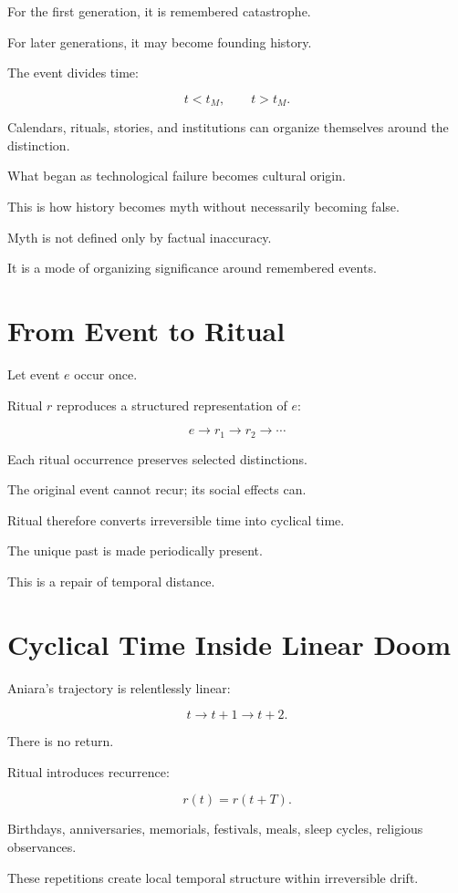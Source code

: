 \documentclass[11pt,oneside]{book}
\theoremstyle{definition}
\theoremstyle{remark}
\begin{document}
For the first generation, it is remembered catastrophe.

For later generations, it may become founding history.

The event divides time:

\[
t<t_M,
\qquad
t>t_M.
\]

Calendars, rituals, stories, and institutions can organize themselves around the distinction.

What began as technological failure becomes cultural origin.

This is how history becomes myth without necessarily becoming false.

Myth is not defined only by factual inaccuracy.

It is a mode of organizing significance around remembered events.

\section{From Event to Ritual}

Let event \(e\) occur once.

Ritual \(r\) reproduces a structured representation of \(e\):

\[
e
\rightarrow
r_1
\rightarrow
r_2
\rightarrow
\cdots
\]

Each ritual occurrence preserves selected distinctions.

The original event cannot recur; its social effects can.

Ritual therefore converts irreversible time into cyclical time.

The unique past is made periodically present.

This is a repair of temporal distance.

\section{Cyclical Time Inside Linear Doom}

Aniara's trajectory is relentlessly linear:

\[
t\rightarrow t+1\rightarrow t+2.
\]

There is no return.

Ritual introduces recurrence:

\[
r(t)
=
r(t+T).
\]

Birthdays, anniversaries, memorials, festivals, meals, sleep cycles, religious observances.

These repetitions create local temporal structure within irreversible drift.
\end{document}
